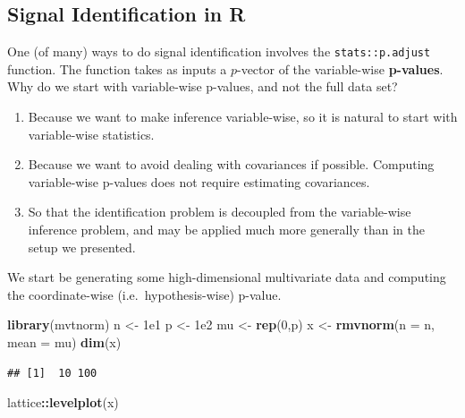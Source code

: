 \documentclass[]{book}
\newenvironment{Shaded}{\begin{snugshade}}{\end{snugshade}}
\newcommand{\KeywordTok}[1]{\textcolor[rgb]{0.13,0.29,0.53}{\textbf{#1}}}
\newcommand{\DataTypeTok}[1]{\textcolor[rgb]{0.13,0.29,0.53}{#1}}
\newcommand{\DecValTok}[1]{\textcolor[rgb]{0.00,0.00,0.81}{#1}}
\newcommand{\FloatTok}[1]{\textcolor[rgb]{0.00,0.00,0.81}{#1}}
\newcommand{\StringTok}[1]{\textcolor[rgb]{0.31,0.60,0.02}{#1}}
\newcommand{\OperatorTok}[1]{\textcolor[rgb]{0.81,0.36,0.00}{\textbf{#1}}}
\newcommand{\NormalTok}[1]{#1}
\providecommand{\tightlist}{%
  \setlength{\itemsep}{0pt}\setlength{\parskip}{0pt}}
\theoremstyle{definition}
\theoremstyle{definition}
\theoremstyle{definition}
\theoremstyle{remark}
\begin{document}
\subsection{Signal Identification in
R}\label{signal-identification-in-r}

One (of many) ways to do signal identification involves the
\texttt{stats::p.adjust} function. The function takes as inputs a
\(p\)-vector of the variable-wise \textbf{p-values}. Why do we start
with variable-wise p-values, and not the full data set?

\begin{enumerate}
\def\labelenumi{\alph{enumi}.}
\tightlist
\item
  Because we want to make inference variable-wise, so it is natural to
  start with variable-wise statistics.
\item
  Because we want to avoid dealing with covariances if possible.
  Computing variable-wise p-values does not require estimating
  covariances.
\item
  So that the identification problem is decoupled from the variable-wise
  inference problem, and may be applied much more generally than in the
  setup we presented.
\end{enumerate}

We start be generating some high-dimensional multivariate data and
computing the coordinate-wise (i.e.~hypothesis-wise) p-value.

\begin{Shaded}
\begin{Highlighting}[]
\KeywordTok{library}\NormalTok{(mvtnorm)}
\NormalTok{n <-}\StringTok{ }\FloatTok{1e1}
\NormalTok{p <-}\StringTok{ }\FloatTok{1e2}
\NormalTok{mu <-}\StringTok{ }\KeywordTok{rep}\NormalTok{(}\DecValTok{0}\NormalTok{,p)}
\NormalTok{x <-}\StringTok{ }\KeywordTok{rmvnorm}\NormalTok{(}\DataTypeTok{n =}\NormalTok{ n, }\DataTypeTok{mean =}\NormalTok{ mu)}
\KeywordTok{dim}\NormalTok{(x)}
\end{Highlighting}
\end{Shaded}

\begin{verbatim}
## [1]  10 100
\end{verbatim}

\begin{Shaded}
\begin{Highlighting}[]
\NormalTok{lattice}\OperatorTok{::}\KeywordTok{levelplot}\NormalTok{(x)}
\end{Highlighting}
\end{Shaded}
\end{document}
